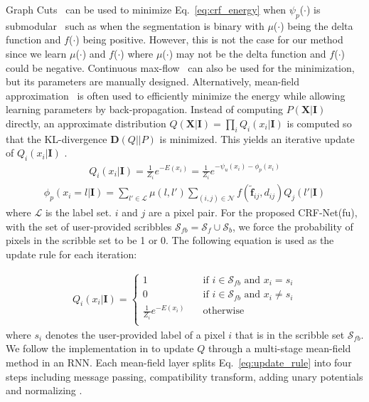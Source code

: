 \documentclass[10pt,journal,compsoc]{IEEEtran}
\begin{document}
Graph Cuts~\cite{Boykov2001, Szummer2008} can be used to minimize Eq.~\eqref{eq:crf_energy} when $\psi_p$($\cdot$) is submodular~\cite{Kolmogorov2004} such as when the segmentation is binary with $\mu$($\cdot$) being the delta function and $f$($\cdot$) being positive. However, this is not the case for our method since we learn $\mu$($\cdot$) and $f$($\cdot$) where $\mu$($\cdot$) may not be the delta function and $f$($\cdot$) could be negative. Continuous max-flow~\cite{Yuan2010} can also be used for the minimization, but its parameters are manually designed. Alternatively, mean-field approximation~\cite{Zheng2015a, Krahenbuhl2011, Vemulapalli2016} is often used to efficiently minimize the energy while allowing learning parameters by back-propagation. Instead of computing $P(\mathbf{X}|\mathbf{I})$ directly, an approximate distribution $Q(\mathbf{X}|\mathbf{I}) = \prod_iQ_i(x_i|\mathbf{I})$ is computed so that the KL-divergence $\mathbf{D}(Q||P)$ is minimized. This yields an iterative update of $Q_i(x_i|\mathbf{I})$ \cite{Zheng2015a, Krahenbuhl2011, Vemulapalli2016}. 
\begin{align}
Q_i(x_i|\mathbf{I})=\frac{1}{Z_i}e ^{-E(x_i)}=
\frac{1}{Z_i}e^{
-\psi_u(x_i)
-\phi_p(x_i)}\label{eq:update_rule}
\end{align}
\begin{align}
\phi_p(x_i=l|\mathbf{I})=
\sum_{l'\in \mathcal L}\mu(l,l')\sum_{(i,j)\in \mathcal N}f(\mathbf{\tilde{f}}_{ij}, d_{ij})Q_j(l'|\mathbf{I})   
\label{eq:update_rule2}
\end{align}
where $\mathcal L$ is the label set. $i$ and $j$ are a pixel pair. For the proposed CRF-Net(fu), with the set of user-provided scribbles $\mathcal S_{fb} = \mathcal S_f \cup \mathcal S_b$, we force the probability of pixels in the scribble set to be 1 or 0. The following equation is used as the update rule for each iteration:   


\begin{align}
Q_i(x_i|\mathbf{I})= 
\begin{cases}
1       & \quad \text{if } i \in \mathcal S_{fb}  \text{ and } x_i=s_i\\
0       & \quad \text{if } i \in \mathcal S_{fb}  \text{ and } x_i\neq s_i\\
\frac{1}{Z_i}e ^{-E(x_i)}  & \quad \text{otherwise } \\
\end{cases}\label{eq:update_rule_with_scrible}
\end{align}
where $s_i$ denotes the user-provided label of a pixel $i$ that is in the scribble set $\mathcal S_{fb}$. 
We follow the implementation in \cite{Zheng2015a} to update $Q$ through a multi-stage mean-field method in an RNN. Each mean-field layer splits Eq.~\eqref{eq:update_rule} into four steps including message passing, compatibility transform, adding unary potentials and normalizing \cite{Zheng2015a}.
\end{document}
